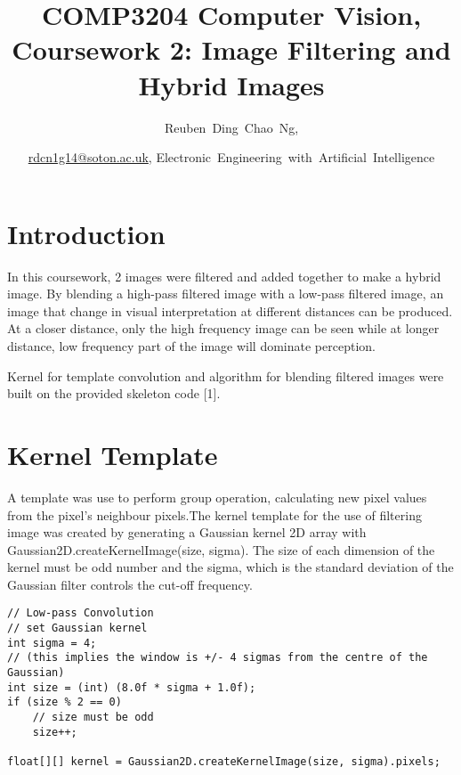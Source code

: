 \documentclass[journal]{IEEEtran}
\begin{document}
%
\title{COMP3204 Computer Vision, Coursework 2: Image Filtering and Hybrid Images}

\author{Reuben~Ding~Chao~Ng, \and \href{mailto:rdcn1g14@soton.ac.uk}{rdcn1g14@soton.ac.uk}, 
Electronic~Engineering~with~Artificial~Intelligence}%

\maketitle

\section{Introduction}

\vspace{1em}

In this coursework, 2 images were filtered and added together to make a hybrid image. By blending a high-pass filtered image with a low-pass filtered image, an image that change in visual interpretation at different distances can be produced. At a closer distance, only the high frequency image can be seen while at longer distance, low frequency part of the image will dominate perception.

Kernel for template convolution and algorithm for blending filtered images were built on the provided skeleton code [1].

\section{Kernel Template}

A template was use to perform group operation, calculating new pixel values from the pixel's neighbour pixels.The kernel template for the use of filtering image was created by generating a Gaussian kernel 2D array with Gaussian2D.createKernelImage(size, sigma). The size of each dimension of the kernel must be odd number and the sigma, which is the standard deviation of the Gaussian filter controls the cut-off frequency.

\begin{lstlisting}
// Low-pass Convolution
// set Gaussian kernel
int sigma = 4;
// (this implies the window is +/- 4 sigmas from the centre of the Gaussian)
int size = (int) (8.0f * sigma + 1.0f); 
if (size % 2 == 0) 
    // size must be odd
	size++; 
	  	
float[][] kernel = Gaussian2D.createKernelImage(size, sigma).pixels;
\end{lstlisting}
\end{document}
